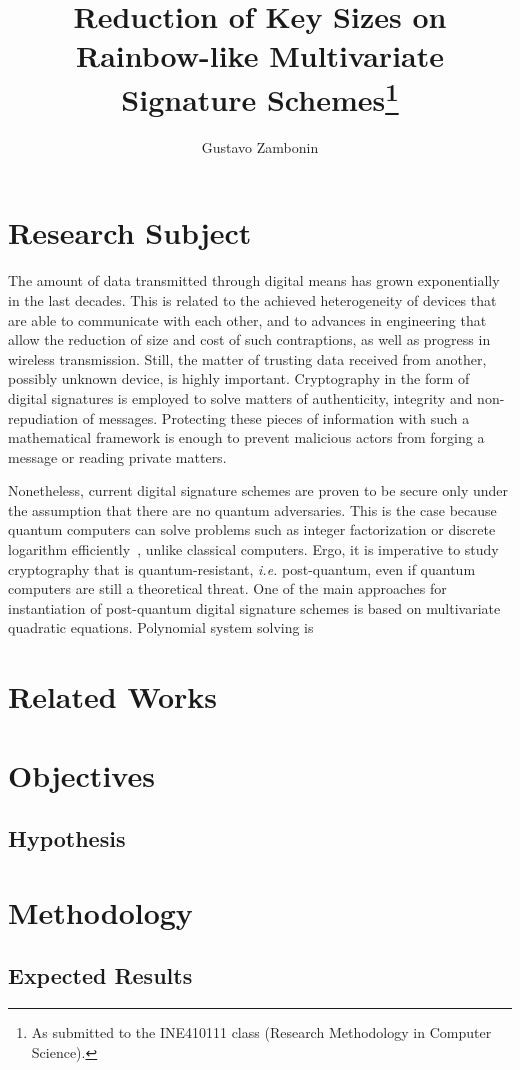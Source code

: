 \documentclass[10pt]{article}
\title{Reduction of Key Sizes on Rainbow-like Multivariate Signature Schemes\footnote{
    As submitted to the INE410111 class (Research Methodology in Computer Science).}}
\author{Gustavo Zambonin\inst{1}}
\begin{document}
 

\maketitle

\section{Research Subject}

The amount of data transmitted through digital means has grown exponentially in the last decades. This is related to the achieved heterogeneity of devices that are able to communicate with each other, and to advances in engineering that allow the reduction of size and cost of such contraptions, as well as progress in wireless transmission. Still, the matter of trusting data received from another, possibly unknown device, is highly important. Cryptography in the form of digital signatures is employed to solve matters of authenticity, integrity and non-repudiation of messages. Protecting these pieces of information with such a mathematical framework is enough to prevent malicious actors from forging a message or reading private matters.

Nonetheless, current digital signature schemes are proven to be secure only under the assumption that there are no quantum adversaries. This is the case because quantum computers can solve problems such as integer factorization or discrete logarithm efficiently~\cite{}, unlike classical computers. Ergo, it is imperative to study cryptography that is quantum-resistant, \emph{i.e.} post-quantum, even if quantum computers are still a theoretical threat. One of the main approaches for instantiation of post-quantum digital signature schemes is based on multivariate quadratic equations. Polynomial system solving is 

\section{Related Works}

\section{Objectives}

\subsection{Hypothesis}

\section{Methodology}

\subsection{Expected Results}



\end{document}
